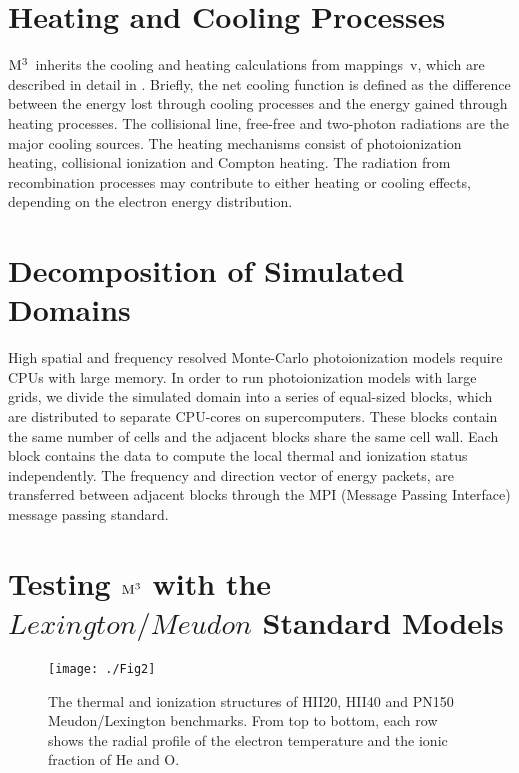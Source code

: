 \documentclass[twocolumn]{aastex62}
\newcommand{\newcode}{{$\rm M^3$}}
\newcommand{\mappings}{{\sc mappings~v}}
\begin{document}
\begin{CJK*}{UTF8}{gbsn}
\section{Heating and Cooling Processes}\label{sec:heatcool}

\newcode\ inherits the cooling and heating calculations from \mappings, which are described in detail in \cite{Sutherland-1993}.
Briefly, the net cooling function is defined as the difference between the energy lost through cooling processes and the energy gained through heating processes.
The collisional line, free-free and two-photon radiations are the major cooling sources. 
The heating mechanisms consist of photoionization heating, collisional ionization and Compton heating. 
The radiation from recombination processes may contribute to either heating or cooling effects, depending on the electron energy distribution.

\section{Decomposition of Simulated Domains}\label{sec:mpi}

High spatial and frequency resolved Monte-Carlo photoionization models require CPUs with large memory.
In order to run photoionization models with large grids, we divide the simulated domain into a series of equal-sized blocks, which are distributed to separate CPU-cores on supercomputers.
These blocks contain the same number of cells and the adjacent blocks share the same cell wall.
Each block contains the data to compute the local thermal and ionization status independently.
The frequency and direction vector of energy packets, are transferred between adjacent blocks through the MPI (Message Passing Interface) message passing standard.


\section{Testing $\rm M^{3}$ with the $Lexington/Meudon$ Standard Models}\label{sec:benchmark}


\begin{figure*}
  \centering
  \texttt{[image: ./Fig2]}
  \caption{The thermal and ionization structures of HII20, HII40 and PN150 Meudon/Lexington benchmarks. From top to bottom, each row shows the radial profile of the electron temperature and the ionic fraction of He and O.}\label{fig2}
\end{figure*}


\end{CJK*}
\end{document}
